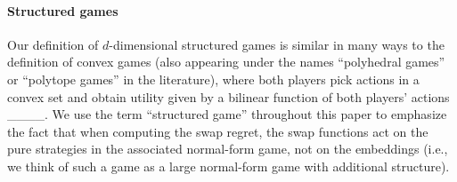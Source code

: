 \paragraph{Structured games} Our definition of $d$-dimensional structured games is similar in many ways to the definition of convex games (also appearing under the names ``polyhedral games'' or ``polytope games'' in the literature), where both players pick actions in a convex set and obtain utility given by a bilinear function of both players' actions ____. We use the term ``structured game'' throughout this paper to emphasize the fact that when computing the swap regret, the swap functions act on the pure strategies in the associated normal-form game, not on the embeddings (i.e., we think of such a game as a large normal-form game with additional structure).